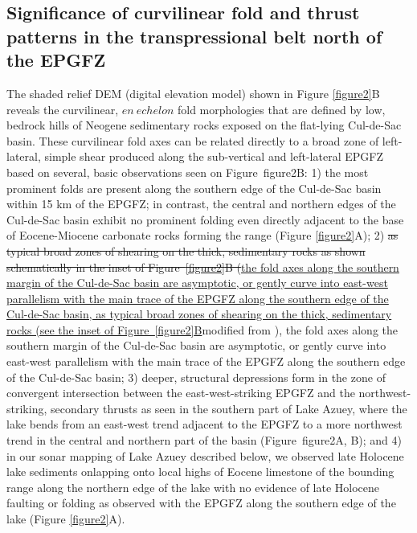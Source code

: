 \documentclass[linenumbers,draft]{agujournal}
\providecommand{\DIFadd}[1]{{\protect\color{blue}\uwave{#1}}} %
\providecommand{\DIFdel}[1]{{\protect\color{red}\sout{#1}}}                      %
\providecommand{\DIFaddbegin}{} %
\providecommand{\DIFaddend}{} %
\providecommand{\DIFdelbegin}{} %
\providecommand{\DIFdelend}{} %
\begin{document}
\subsection{Significance of curvilinear fold and thrust patterns in the transpressional belt north of the EPGFZ}
The shaded relief DEM (digital elevation model) shown in Figure \ref{figure2}B reveals the curvilinear, $en~echelon$ fold morphologies that are defined by low, bedrock hills of Neogene sedimentary rocks exposed on the flat-lying Cul-de-Sac basin. These curvilinear fold axes can be related directly to a broad zone of left-lateral, simple shear produced along the sub-vertical and left-lateral EPGFZ based on several, basic observations seen on Figure~{figure2}B: 1) the most prominent folds are present along the southern edge of the Cul-de-Sac basin within 15 km of the EPGFZ; in contrast, the central and northern edges of the Cul-de-Sac basin exhibit no prominent folding even directly adjacent to the base of Eocene-Miocene carbonate rocks forming the range \citep{pubellier2000plate} (Figure \ref{figure2}A); 2) \DIFdelbegin \DIFdel{as typical broad zones of shearing on the thick, sedimentary rocks as shown schematically in the inset of Figure~\ref{figure2}B (}\DIFdelend \DIFaddbegin \ul{the fold axes along the southern margin of the Cul-de-Sac basin are asymptotic, or gently curve into east-west parallelism with the main trace of the EPGFZ along the southern edge of the Cul-de-Sac basin, as typical broad zones of shearing on the thick, sedimentary rocks (see the inset of Figure~{\ref{figure2}}B}\DIFadd{; }\DIFaddend modified from \citet{odonne1983analogue}), the fold axes along the southern margin of the Cul-de-Sac basin are asymptotic, or gently curve into east-west parallelism with the main trace of the EPGFZ along the southern edge of the Cul-de-Sac basin; 3) deeper, structural depressions form in the zone of convergent intersection between the east-west-striking EPGFZ and the northwest-striking, secondary thrusts as seen in the southern part of Lake Azuey, where the lake bends from an east-west trend adjacent to the EPGFZ to a more northwest trend in the central and northern part of the basin (Figure~{figure2}A, B); and 4) in our sonar mapping of Lake Azuey described below, we observed late Holocene lake sediments onlapping onto local highs of Eocene limestone of the bounding range along the northern edge of the lake with no evidence of late Holocene faulting or folding as observed with the EPGFZ along the southern edge of the lake (Figure \ref{figure2}A). 
\end{document}
